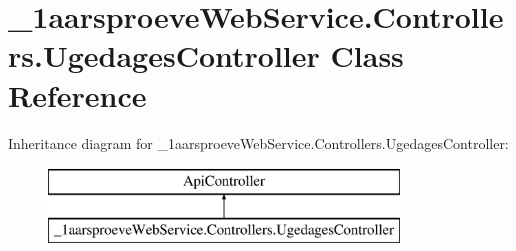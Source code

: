 \hypertarget{class__1aarsproeve_web_service_1_1_controllers_1_1_ugedages_controller}{}\section{\+\_\+1aarsproeve\+Web\+Service.\+Controllers.\+Ugedages\+Controller Class Reference}
\label{class__1aarsproeve_web_service_1_1_controllers_1_1_ugedages_controller}
Inheritance diagram for \+\_\+1aarsproeve\+Web\+Service.\+Controllers.\+Ugedages\+Controller\+:\begin{figure}[H]
\begin{center}
\leavevmode
\includegraphics[height=2.000000cm]{class__1aarsproeve_web_service_1_1_controllers_1_1_ugedages_controller}
\end{center}
\end{figure}

